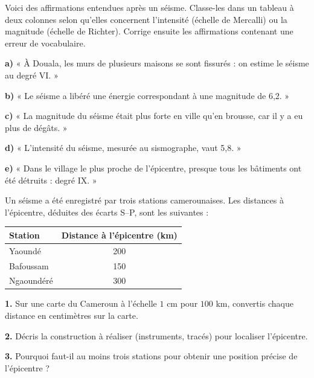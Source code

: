 \documentclass[11pt]{article}
\newcommand{\cle}[1]{{\popxbold\color{popdark}#1}}
\begin{document}
\begin{exercice}
Voici des affirmations entendues après un séisme. Classe-les dans un tableau à deux colonnes selon qu'elles concernent l'\cle{intensité} (échelle de Mercalli) ou la \cle{magnitude} (échelle de Richter). Corrige ensuite les affirmations contenant une erreur de vocabulaire.

\textbf{a)} « À Douala, les murs de plusieurs maisons se sont fissurés : on estime le séisme au degré VI. »

\textbf{b)} « Le séisme a libéré une énergie correspondant à une magnitude de 6,2. »

\textbf{c)} « La magnitude du séisme était plus forte en ville qu'en brousse, car il y a eu plus de dégâts. »

\textbf{d)} « L'intensité du séisme, mesurée au sismographe, vaut 5,8. »

\textbf{e)} « Dans le village le plus proche de l'épicentre, presque tous les bâtiments ont été détruits : degré IX. »
\end{exercice}

\begin{exercice}
Un séisme a été enregistré par trois stations camerounaises. Les distances à l'épicentre, déduites des écarts S--P, sont les suivantes :

\begin{center}
\begin{tabular}{|l|c|}
\hline
\rowcolor{popblueL} Station & Distance à l'épicentre (km) \\
\hline
Yaoundé & 200 \\
\hline
Bafoussam & 150 \\
\hline
Ngaoundéré & 300 \\
\hline
\end{tabular}
\end{center}

\textbf{1.} Sur une carte du Cameroun à l'échelle $1$ cm pour $100$ km, convertis chaque distance en centimètres sur la carte.

\textbf{2.} Décris la construction à réaliser (instruments, tracés) pour localiser l'épicentre.

\textbf{3.} Pourquoi faut-il au moins trois stations pour obtenir une position précise de l'épicentre ?
\end{exercice}
\end{document}
